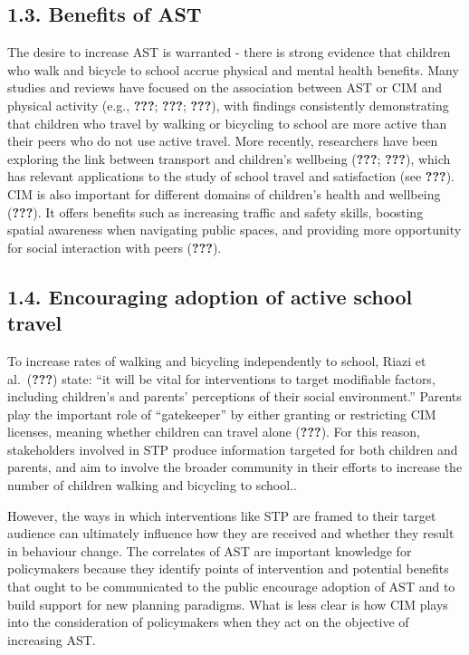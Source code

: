 \documentclass[]{elsarticle} %
\begin{document}
\hypertarget{benefits-of-ast}{%
\subsection{1.3. Benefits of AST}\label{benefits-of-ast}}

The desire to increase AST is warranted - there is strong evidence that
children who walk and bicycle to school accrue physical and mental
health benefits. Many studies and reviews have focused on the
association between AST or CIM and physical activity (e.g.,
{\textbf{???}}; {\textbf{???}}; {\textbf{???}}), with findings
consistently demonstrating that children who travel by walking or
bicycling to school are more active than their peers who do not use
active travel. More recently, researchers have been exploring the link
between transport and children's wellbeing ({\textbf{???}};
{\textbf{???}}), which has relevant applications to the study of school
travel and satisfaction (see {\textbf{???}}). CIM is also important for
different domains of children's health and wellbeing ({\textbf{???}}).
It offers benefits such as increasing traffic and safety skills,
boosting spatial awareness when navigating public spaces, and providing
more opportunity for social interaction with peers ({\textbf{???}}).

\hypertarget{encouraging-adoption-of-active-school-travel}{%
\subsection{1.4. Encouraging adoption of active school
travel}\label{encouraging-adoption-of-active-school-travel}}

To increase rates of walking and bicycling independently to school,
Riazi et al.~({\textbf{???}}) state: ``it will be vital for
interventions to target modifiable factors, including children's and
parents' perceptions of their social environment.'' Parents play the
important role of ``gatekeeper'' by either granting or restricting CIM
licenses, meaning whether children can travel alone ({\textbf{???}}).
For this reason, stakeholders involved in STP produce information
targeted for both children and parents, and aim to involve the broader
community in their efforts to increase the number of children walking
and bicycling to school..

However, the ways in which interventions like STP are framed to their
target audience can ultimately influence how they are received and
whether they result in behaviour change. The correlates of AST are
important knowledge for policymakers because they identify points of
intervention and potential benefits that ought to be communicated to the
public encourage adoption of AST and to build support for new planning
paradigms. What is less clear is how CIM plays into the consideration of
policymakers when they act on the objective of increasing AST.
\end{document}

